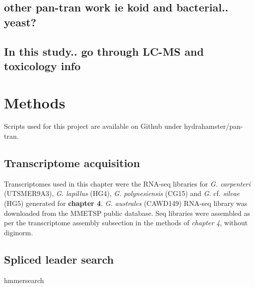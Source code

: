 \documentclass[12pt]{article}
\begin{document}
\subsection*{other pan-tran work ie koid and bacterial.. yeast?}

\subsection*{In this study.. go through LC-MS and toxicology info}

\newpage
\section*{Methods}
Scripts used for this project are available on Github under hydrahamster/pan-tran.
\subsection*{Transcriptome acquisition}
Transcriptomes used in this chapter were the RNA-seq libraries for \textit{G. carpenteri} (UTSMER9A3), \textit{G. lapillus} (HG4), \textit{G. polynesiensis} (CG15) and \textit{G.} cf. \textit{silvae} (HG5) generated for \textbf{chapter 4}. 
\textit{G. australes} (CAWD149) RNA-seq library was downloaded from the MMETSP public database. 
Seq libraries were assembled as per the transcriptome assembly subsection in the methods of \textit{chapter 4}, without diginorm. 

\subsection*{Spliced leader search}
hmmersearch 
\end{document}
